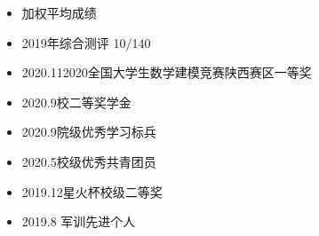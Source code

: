 \begin{itemize}
    \item 加权平均成绩  
    \item 2019年综合测评 10/140
    \item 2020.11\quad 2020全国大学生数学建模竞赛陕西赛区一等奖
    \item 2020.9\quad 校二等奖学金
    \item 2020.9\quad 院级优秀学习标兵
    \item 2020.5\quad 校级优秀共青团员
    \item 2019.12\quad 星火杯校级二等奖
    \item 2019.8 \quad 军训先进个人
\end{itemize}

